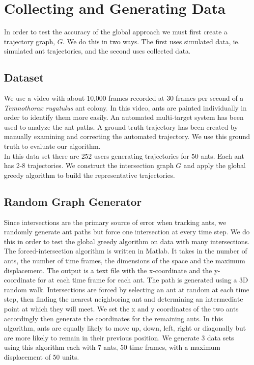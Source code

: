 \documentclass[12pt]{article}
\begin{document}
\section{Collecting and Generating Data}
In order to test the accuracy of the global approach we must first create a trajectory graph, $G$. We do this in two ways. The first uses simulated data, ie. simulated ant trajectories, and the second uses collected data. 

\subsection{Dataset}
We use a video with about 10,000 frames recorded at 30 frames per second of a {\it Temnothorax rugatulus} ant colony. In this video, ants are painted individually in order to identify them more easily. An automated multi-target system has been used to analyze the ant paths. A ground truth trajectory has been created by manually examining and correcting the automated trajectory. We use this ground truth to evaluate our algorithm. \\
In this data set there are 252 users generating trajectories for 50 ants. Each ant has 2-8 trajectories. We construct the intersection graph $G$ and apply the global greedy algorithm to build the representative trajectories. 

\subsection{Random Graph Generator}

Since intersections are the primary source of error when tracking ants, we randomly generate ant paths but force one intersection at every time step. We do this in order to test the global greedy algorithm on data with many intersections. \\
The forced-intersection algorithm is written in Matlab. It takes in the number of ants, the number of time frames, the dimensions of the space and the maximum displacement. The output is a text file with the x-coordinate and the y-coordinate for at each time frame for each ant. The path is generated using a 3D random walk. Intersections are forced by selecting an ant at random at each time step, then finding the nearest neighboring ant and determining an intermediate point at which they will meet. We set the x and y coordinates of the two ants accordingly then generate the coordinates for the remaining ants. In this algorithm, ants are equally likely to move up, down, left, right  or diagonally but are more likely to remain in their previous position. We generate 3 data sets using this algorithm each with 7 ants, 50 time frames, with a maximum displacement of 50 units. \\
\end{document}
